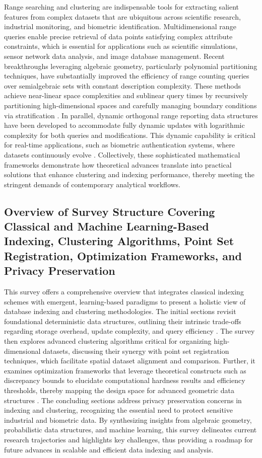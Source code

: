 \documentclass[11pt]{article}
\begin{document}
Range searching and clustering are indispensable tools for extracting salient features from complex datasets that are ubiquitous across scientific research, industrial monitoring, and biometric identification. Multidimensional range queries enable precise retrieval of data points satisfying complex attribute constraints, which is essential for applications such as scientific simulations, sensor network data analysis, and image database management. Recent breakthroughs leveraging algebraic geometry, particularly polynomial partitioning techniques, have substantially improved the efficiency of range counting queries over semialgebraic sets with constant description complexity. These methods achieve near-linear space complexities and sublinear query times by recursively partitioning high-dimensional spaces and carefully managing boundary conditions via stratification \cite{ref2}. In parallel, dynamic orthogonal range reporting data structures have been developed to accommodate fully dynamic updates with logarithmic complexity for both queries and modifications. This dynamic capability is critical for real-time applications, such as biometric authentication systems, where datasets continuously evolve \cite{ref3}. Collectively, these sophisticated mathematical frameworks demonstrate how theoretical advances translate into practical solutions that enhance clustering and indexing performance, thereby meeting the stringent demands of contemporary analytical workflows.

\subsection{Overview of Survey Structure Covering Classical and Machine Learning-Based Indexing, Clustering Algorithms, Point Set Registration, Optimization Frameworks, and Privacy Preservation}

This survey offers a comprehensive overview that integrates classical indexing schemes with emergent, learning-based paradigms to present a holistic view of database indexing and clustering methodologies. The initial sections revisit foundational deterministic data structures, outlining their intrinsic trade-offs regarding storage overhead, update complexity, and query efficiency \cite{ref31}. The survey then explores advanced clustering algorithms critical for organizing high-dimensional datasets, discussing their synergy with point set registration techniques, which facilitate spatial dataset alignment and comparison. Further, it examines optimization frameworks that leverage theoretical constructs such as discrepancy bounds to elucidate computational hardness results and efficiency thresholds, thereby mapping the design space for advanced geometric data structures \cite{ref1,ref2,ref3}. The concluding sections address privacy preservation concerns in indexing and clustering, recognizing the essential need to protect sensitive industrial and biometric data. By synthesizing insights from algebraic geometry, probabilistic data structures, and machine learning, this survey delineates current research trajectories and highlights key challenges, thus providing a roadmap for future advances in scalable and efficient data indexing and analysis.
\end{document}
